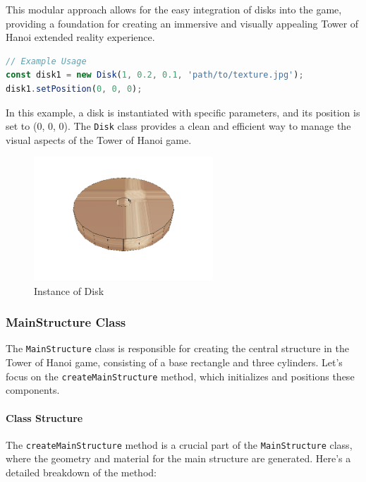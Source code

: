 \documentclass{article}
\begin{document}
This modular approach allows for the easy integration of disks into the game, providing a foundation for creating an immersive and visually appealing Tower of Hanoi extended reality experience.

\begin{lstlisting}[language=JavaScript, caption={JS Example for Disk}]
// Example Usage
const disk1 = new Disk(1, 0.2, 0.1, 'path/to/texture.jpg');
disk1.setPosition(0, 0, 0);
\end{lstlisting}

In this example, a disk is instantiated with specific parameters, and its position is set to (0, 0, 0). The \texttt{Disk} class provides a clean and efficient way to manage the visual aspects of the Tower of Hanoi game.



\begin{figure}[h]
    \centering
    \includegraphics[width=0.6\textwidth]{img/disk.png}
    \caption{Instance of Disk}
    \label{fig:disk}
\end{figure}


\subsubsection{MainStructure Class}

The \texttt{MainStructure} class is responsible for creating the central structure in the Tower of Hanoi game, consisting of a base rectangle and three cylinders. Let's focus on the \texttt{createMainStructure} method, which initializes and positions these components.

\paragraph{Class Structure}

The \texttt{createMainStructure} method is a crucial part of the \texttt{MainStructure} class, where the geometry and material for the main structure are generated. Here's a detailed breakdown of the method:
\end{document}
